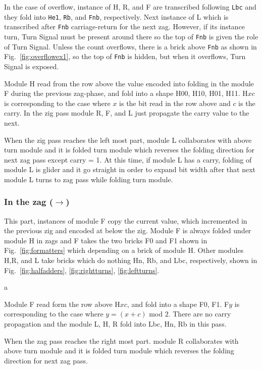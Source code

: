 \documentclass[runningheads]{llncs}
\begin{document}
In the case of overflow, instance of H,  R, and F are transcribed following \texttt{Lbc} and they fold into \texttt{He1}, \texttt{Rb}, and \texttt{Fnb}, respectively.
Next instance of L which is transcribed after \texttt{Fnb} carriage-return for the next zag.
However, if its instance turn, Turn Signal must be present around there so the top of \texttt{Fnb} is given the role of Turn Signal.
Unless the count overflows, there is a brick above \texttt{Fnb} as shown in Fig.~\ref{fig:overflowex1}, so the top of \texttt{Fnb} is hidden, but when it overflows, Turn Signal is exposed.

Module H read from the row above the value encoded into folding in the module F during the previous zag-phase, and fold into a shape H00, H10, H01, H11.
H$xc$ is corresponding to the case where $x$ is the bit read in the row above and $c$ is the carry. 
In the zig pass module R, F, and L just propagate the carry value to the next.

When the zig pass reaches the left most part, module L collaborates with above turn module and it is folded turn module which reverses the folding direction for next zag pass except carry = 1.
At this time, if module L has a carry, folding of module L is glider and it go straight in order to expand bit width after that next module L turns to zag pass while folding turn module.

\subsubsection{In the zag ($\rightarrow$)}
This part, instances of module F copy the current value, which incremented in the previous zig and encoded at below the zig.
Module F is always folded under module H in zags and F takes the two bricks F0 and F1 shown in Fig.~\ref{fig:formatters} which depending on a brick of module H.
Other modules H,R, and L take bricks which do nothing Hn, Rb, and Lbc, respectively, shown in Fig.~\ref{fig:halfadders}, \ref{fig:rightturns}, \ref{fig:leftturns}. 

a


Module F read form the row above H$xc$, and fold into a shape F0, F1.
F$y$ is corresponding to the case where $y = (x + c)$ mod $2$.
There are no carry propagation and the module L, H, R fold into Lbc, Hn, Rb in this pass.

When the zag pass reaches the right most part. module R collaborates with above turn module and it is folded turn module which reverses the folding direction for next zag pass.
\end{document}
